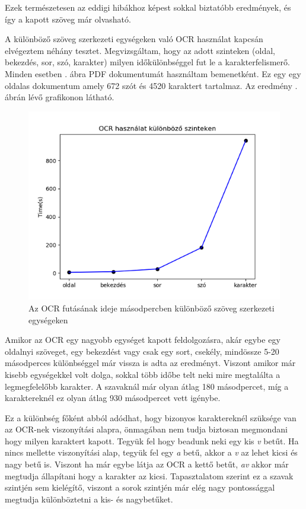 Ezek természetesen az eddigi hibákhoz képest sokkal biztatóbb eredmények, és így a kapott szöveg már olvasható.

A különböző szöveg szerkezeti egységeken való OCR használat kapcsán elvégeztem néhány tesztet. Megvizsgáltam, hogy az adott szinteken (oldal, bekezdés, sor, szó, karakter) milyen időkülönbséggel fut le a karakterfelismerő. Minden esetben . ábra PDF dokumentumát használtam bemenetként. Ez egy egy oldalas dokumentum amely 672 szót és 4520 karaktert tartalmaz. Az eredmény . ábrán lévő grafikonon látható.

\begin{figure}[h!]
\centering
\includegraphics[scale=1]{images/test_ocr.png}
\caption{Az OCR futásának ideje másodpercben különböző szöveg szerkezeti egységeken}
\label{fig:test_ocr}
\end{figure}

Amikor az OCR egy nagyobb egységet kapott feldolgozásra, akár egybe egy oldalnyi szöveget, egy bekezdést vagy csak egy sort, csekély, mindössze 5-20 másodperces különbséggel már vissza is adta az eredményt. Viszont amikor már kisebb egységekkel volt dolga, sokkal több időbe telt neki mire megtalálta a legmegfelelőbb karakter. A szavaknál már olyan átlag 180 másodpercet, míg a karaktereknél ez olyan átlag 930 másodpercet vett igénybe.

Ez a különbség főként abból adódhat, hogy bizonyos karaktereknél szüksége van az OCR-nek viszonyítási alapra, önmagában nem tudja biztosan megmondani hogy milyen karaktert kapott. Tegyük fel hogy beadunk neki egy kis \emph{v} betűt. Ha nincs mellette viszonyítási alap, tegyük fel egy \emph{a} betű, akkor a \emph{v} az lehet kicsi és nagy betű is. Viszont ha már egybe látja az OCR a kettő betűt, \emph{av} akkor már megtudja állapítani hogy a karakter az kicsi. Tapasztalatom szerint ez a szavak szintjén sem kielégítő, viszont a sorok szintjén már elég nagy pontossággal megtudja különböztetni a kis- és nagybetűket.

